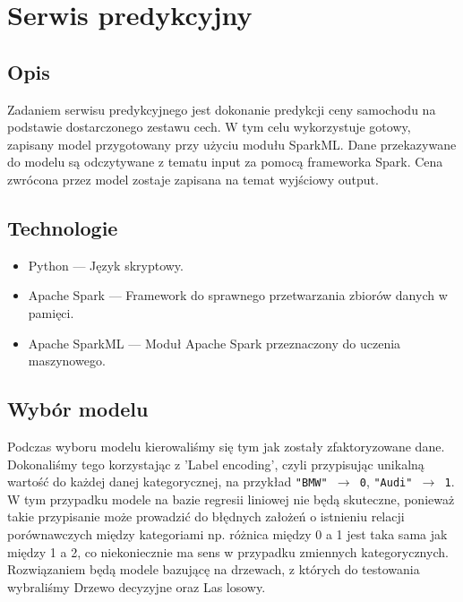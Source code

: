 \documentclass[12pt, a4paper]{report}
\begin{document}
\chapter{Serwis predykcyjny}
\section{Opis}
    Zadaniem serwisu predykcyjnego jest dokonanie predykcji ceny samochodu na podstawie dostarczonego zestawu cech.
    W tym celu wykorzystuje gotowy, zapisany model przygotowany przy użyciu modułu SparkML.\@
    Dane przekazywane do modelu są odczytywane z tematu input za pomocą frameworka Spark. Cena zwrócona przez
    model zostaje zapisana na temat wyjściowy output.
\section{Technologie}
\begin{itemize}
    \item Python --- Język skryptowy. 
    \item Apache Spark --- Framework do sprawnego przetwarzania zbiorów danych w pamięci.
    \item Apache SparkML --- Moduł Apache Spark przeznaczony do uczenia maszynowego.
\end{itemize}

\section{Wybór modelu}
    Podczas wyboru modelu kierowaliśmy się tym jak zostały zfaktoryzowane dane. Dokonaliśmy tego korzystając z 'Label encoding', czyli przypisując unikalną wartość do każdej danej kategorycznej, na przykład \texttt{"BMW" $\rightarrow$ 0}, \texttt{"Audi" $\rightarrow$ 1}. \\
    W tym przypadku modele na bazie regresii liniowej nie będą skuteczne, ponieważ takie przypisanie może prowadzić do błędnych założeń o istnieniu relacji porównawczych między kategoriami np. różnica między 0 a 1 jest taka sama jak między 1 a 2, co niekoniecznie ma sens w przypadku zmiennych kategorycznych.\\
    Rozwiązaniem będą modele bazującę na drzewach, z których do testowania wybraliśmy Drzewo decyzyjne oraz Las losowy.
\end{document}

